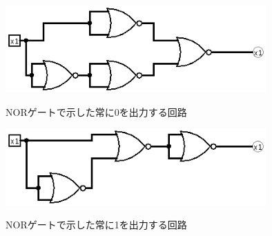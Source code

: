 \documentclass[a4paper,11pt,titlepage]{jarticle}
\begin{document}
\par
\begin{figure}[htbp]
  \centering
  \includegraphics[width=100mm]{sample17.png}
  \label{sample13}\\
  \caption{NORゲートで示した常に0を出力する回路}
\end{figure}
\par
\begin{figure}[htbp]
  \centering
  \includegraphics[width=100mm]{sample16.png}
  \label{sample14}\\
  \caption{NORゲートで示した常に1を出力する回路}
\end{figure}
\par
\end{document}
